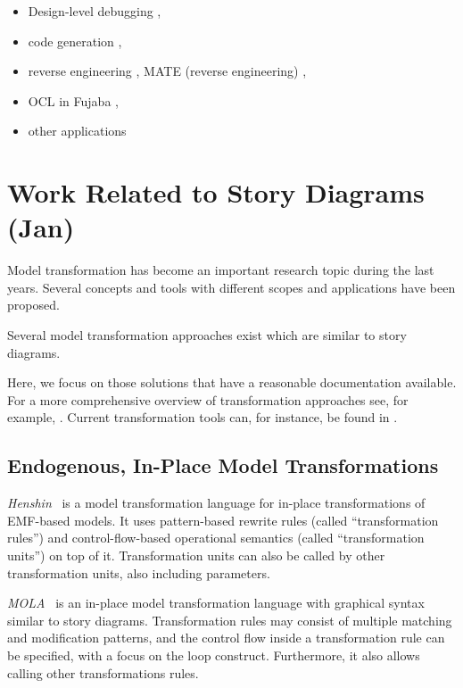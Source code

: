 \begin{itemize}
\item Design-level debugging \cite{GZ02,Gei02,GZ06},
\item code generation \cite{GSR05,GBD07},
\item reverse engineering \cite{NSW+02,BGS+Z08}, MATE (reverse engineering) \cite{SKS+07,ST08},
\item OCL in Fujaba \cite{SZG07},
\item other applications \cite{KNNZ00,GZ10}
\end{itemize}


\section{Work Related to Story Diagrams (Jan)}

Model transformation has become an important research topic during the last years.
Several concepts and tools with different scopes and applications have been proposed.

Several model transformation approaches exist which are similar to story diagrams.

Here, we focus on those solutions that have a reasonable documentation available.
For a more comprehensive overview of transformation approaches see, for example, \cite{Czarnecki06}.
Current transformation tools can, for instance, be found in \cite{TTC2010}.

\subsection{Endogenous, In-Place Model Transformations}

\emph{Henshin}~\cite{henshin2} is a model transformation language for in-place transformations of EMF-based models.
It uses pattern-based rewrite rules (called ``transformation rules'') and control-flow-based operational semantics (called ``transformation units'') on top of it.
Transformation units can also be called by other transformation units, also including parameters.

\emph{MOLA}~\cite{mola} is an in-place model transformation language with graphical syntax similar to story diagrams.
Transformation rules may consist of multiple matching and modification patterns, and the control flow inside a transformation rule can be specified, with a focus on the loop construct.
Furthermore, it also allows calling other transformations rules. %

